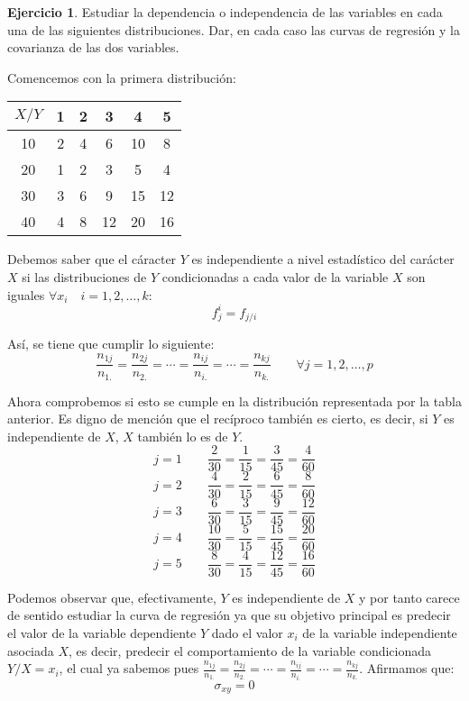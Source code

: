\documentclass[a4paper, 12pt]{article}
\theoremstyle{definition}
\newtheorem{ej}{Ejercicio}
\begin{document}
\begin{ej}
Estudiar la dependencia o independencia de las variables en cada una de las siguientes distribuciones. Dar, en cada caso las curvas de regresión y la covarianza de las dos variables. \\

\par

Comencemos con la primera distribución:

\begin{center}
\begin{tabular}{c|ccccc}
	\(X/Y\) & 1 & 2 & 3 & 4 & 5 \\
	\hline
	10 & 2 & 4 & 6 & 10 & 8 \\
	20 & 1 & 2 & 3 & 5 & 4 \\
	30 & 3 & 6 & 9 & 15 & 12 \\
	40 & 4 & 8 & 12 & 20 & 16
\end{tabular}
\end{center}

Debemos saber que el cáracter \(Y\) es independiente a nivel estadístico del carácter \(X\) si las distribuciones de \(Y\) condicionadas a cada valor de la variable \(X\) son iguales \(\forall x_i \quad i = 1, 2, \dotsc, k\):
\[
	f_j^i = f_{j/i}
\]

Así, se tiene que cumplir lo siguiente:
\begin{equation} \label{ref:independenciaXY}
	\frac{n_{1j}}{n_{1.}} = \frac{n_{2j}}{n_{2.}} = \dotsm = \frac{n_{ij}}{n_{i.}} = \dotsm = \frac{n_{kj}}{n_{k.}} \qquad \forall j = 1,2, \dotsc, p
\end{equation}

Ahora comprobemos si esto se cumple en la distribución representada por la tabla anterior. Es digno de mención que el recíproco también es cierto, es decir, si \(Y\) es independiente de \(X\), \(X\) también lo es de \(Y\).
\[
	j = 1 \qquad \frac{2}{30} = \frac{1}{15} = \frac{3}{45} = \frac{4}{60}
\]
\[
	j = 2 \qquad \frac{4}{30} = \frac{2}{15} = \frac{6}{45} = \frac{8}{60}
\]
\[
	j = 3 \qquad \frac{6}{30} = \frac{3}{15} = \frac{9}{45} = \frac{12}{60}
\]
\[
	j = 4 \qquad \frac{10}{30} = \frac{5}{15} = \frac{15}{45} = \frac{20}{60}
\]
\[
	j = 5 \qquad \frac{8}{30} = \frac{4}{15} = \frac{12}{45} = \frac{16}{60}
\]

Podemos observar que, efectivamente, \(Y\) es independiente de \(X\) y por tanto carece de sentido estudiar la curva de regresión ya que su objetivo principal es predecir el valor de la variable dependiente $Y$ dado el valor $x_i$ de la variable independiente asociada $X$, es decir, predecir el comportamiento de la variable condicionada $Y/X = x_i$, el cual ya sabemos pues $\frac{n_{1j}}{n_{1.}} = \frac{n_{2j}}{n_{2.}} = \dotsm = \frac{n_{ij}}{n_{i.}} = \dotsm = \frac{n_{kj}}{n_{k.}}$. Afirmamos que:
\[
	\sigma_{xy} = 0
\]


\end{ej}
\end{document}
